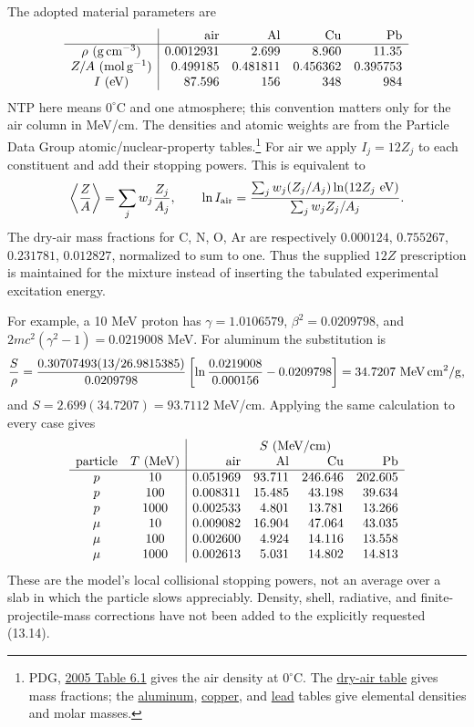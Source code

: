 The adopted material parameters are
\[
\begin{array}{c|rrrr}
 &\text{air}&\text{Al}&\text{Cu}&\text{Pb}\\ \hline
 \rho\ ({\rm g\,cm^{-3}})&0.0012931&2.699&8.960&11.35\\
 Z/A\ ({\rm mol\,g^{-1}})&0.499185&0.481811&0.456362&0.395753\\
 I\ ({\rm eV})&87.596&156&348&984
\end{array}
\]
NTP here means $0^\circ$C and one atmosphere; this convention matters only
for the air column in MeV/cm. The densities and atomic weights are from
the Particle Data Group atomic/nuclear-property tables.\footnote{PDG,
\href{https://pdg.lbl.gov/2005/reviews/atomicrpp.pdf}{2005 Table 6.1}
gives the air density at $0^\circ$C.
The \href{https://pdg.lbl.gov/2024/AtomicNuclearProperties/HTML/air_dry_1_atm.html}{dry-air table}
gives mass fractions; the
\href{https://pdgprod.lbl.gov/~deg/AtomicNuclearProperties/HTML/aluminum_Al.html}{aluminum},
\href{https://pdgprod.lbl.gov/~deg/AtomicNuclearProperties/HTML/copper_Cu.html}{copper},
and \href{https://pdgprod.lbl.gov/~deg/AtomicNuclearProperties/HTML/lead_Pb.html}{lead}
tables give elemental densities and molar masses.}
For air we apply $I_j=12Z_j$ to each constituent and add their stopping
powers. This is equivalent to
\[
 \left\langle\frac ZA\right\rangle=\sum_jw_j\frac{Z_j}{A_j},
 \qquad
 \ln I_{\rm air}=
 \frac{\sum_jw_j(Z_j/A_j)\ln(12Z_j\ {\rm eV})}
      {\sum_jw_j Z_j/A_j}.
\]
The dry-air mass fractions for C, N, O, Ar are respectively
$0.000124$, $0.755267$, $0.231781$, $0.012827$, normalized to sum to one.
Thus the supplied $12Z$ prescription is maintained for the mixture
instead of inserting the tabulated experimental excitation energy.

For example, a 10 MeV proton has $\gamma=1.0106579$,
$\beta^2=0.0209798$, and $2mc^2(\gamma^2-1)=0.0219008$ MeV.
For aluminum the substitution is
\[
 \frac{S}{\rho}
 =\frac{0.30707493(13/26.9815385)}{0.0209798}
 \left[\ln\frac{0.0219008}{0.000156}-0.0209798\right]
 =34.7207\ {\rm MeV\,cm^2/g},
\]
and $S=2.699(34.7207)=93.7112$ MeV/cm.
Applying the same calculation to every case gives
\[
\begin{array}{cc|rrrr}
 &&\multicolumn{4}{c}{S\ ({\rm MeV/cm})}\\
 \text{particle}&T\ ({\rm MeV})&\text{air}&\text{Al}&\text{Cu}&\text{Pb}\\ \hline
 p&10&0.051969&93.711&246.646&202.605\\
 p&100&0.008311&15.485&43.198&39.634\\
 p&1000&0.002533&4.801&13.781&13.266\\
 \mu&10&0.009082&16.904&47.064&43.035\\
 \mu&100&0.002600&4.924&14.116&13.558\\
 \mu&1000&0.002613&5.031&14.802&14.813
\end{array}
\]
These are the model's local collisional stopping powers, not an average
over a slab in which the particle slows appreciably. Density, shell,
radiative, and finite-projectile-mass corrections have not been added
to the explicitly requested (13.14).

